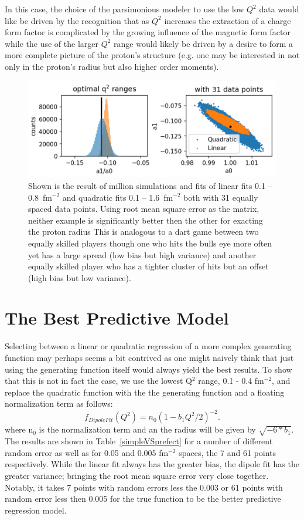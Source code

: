\documentclass[10pt,aps,prc,twocolumn]{revtex4-1}
\begin{document}
In this case, the choice of the parsimonious modeler to use the low $Q^2$ data would like be driven by the recognition that as $Q^2$ increases
the extraction of a charge form factor is complicated by the growing influence of the magnetic form factor while the use of the larger $Q^2$
range would likely be driven by a desire to form a more complete picture of the proton's structure 
(e.g. one may be interested in not only in the proton's radius but also higher order moments).

\begin{figure}
\label{zoptimized}
\includegraphics[width=\columnwidth]{Figure/zoptimized.png}
\caption{Shown is the result of million simulations and fits of linear fits  0.1 -- 0.8~fm$^{-2}$ 
and quadratic fits 0.1 -- 1.6~fm$^{-2}$ both with 31 equally spaced data points.    Using root mean
square error as the matrix, neither example is significantly better then the other for exacting the proton
radius   This is analogous to a dart game between two equally skilled players though one who hits the bulls eye more 
often yet has a large spread (low bias but high variance) and another equally skilled player who has a tighter cluster of hits
but an offset (high bias but low variance).}
\end{figure}


\section{The Best Predictive Model}

Selecting between a linear or quadratic regression of a more complex generating function may perhaps seems 
a bit contrived as one might naively think that just using the generating function itself would always yield the
best results.   To show that this is not in fact the case, 
we use the lowest Q$^2$ range, 0.1 - 0.4 fm$^{-2}$, and replace the quadratic function 
with the the generating function and a floating normalization term as follows:
\begin{equation}
f_{Dipole Fit}(Q^2) =  n_0 ( 1 - b_1 Q^2 / 2)^{-2}.
\end{equation}
where n$_0$ is the normalization term and an the radius will be given by $\sqrt{-6*b_1}$.
The results are shown in Table~\ref{simpleVSprefect} for a number of different random error as well as
for 0.05 and 0.005 fm$^{-2}$ spaces, the 7 and 61 points respectively.   While the linear fit always has
the greater bias, the dipole fit has the greater variance; bringing the root mean square error very close
together.   Notably, it takes 7 points with random errors less the 0.003 or 61 points with random error less
then 0.005 for the true function to be the better predictive regression model.
\end{document}
